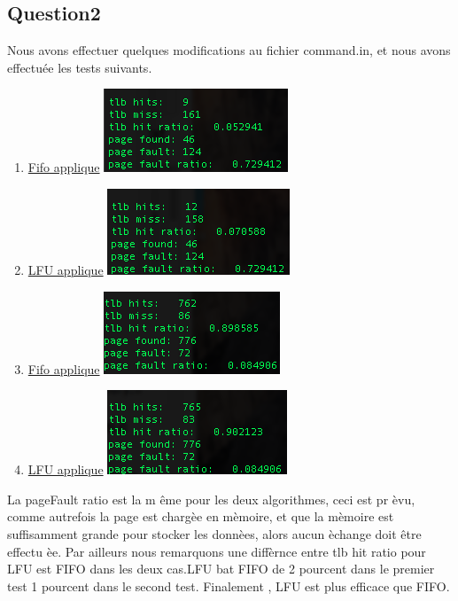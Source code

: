 \documentclass{article}
\begin{document}
\subsection{Question2}
Nous avons effectuer quelques modifications au fichier command.in, et nous avons effectu\'{e}e les tests suivants.
\begin{enumerate}
\item \underline{ Fifo applique} 
\newline
\includegraphics{./images/CaptureFIFO.png}
\item \underline{ LFU applique} 
\newline
\includegraphics{./images/CaptureLFU.png}
 \item \underline{ Fifo applique} 
 \newline
\includegraphics{./images/CaptureFIFO1.png}
 \item \underline{ LFU applique}
 \newline
\includegraphics{./images/CaptureLFU1.png}
\end{enumerate}
La pageFault ratio est la m \^{e}me pour les deux algorithmes, ceci est pr \`{e}vu, comme autrefois la page est charg\`{e}e en m\`{e}moire, et que la m\`{e}moire est suffisamment grande pour stocker les donn\`{e}es, alors aucun  \`{e}change doit \^{e}tre effectu \`{e}e.
Par ailleurs nous remarquons une diff\`{e}rnce entre tlb hit ratio pour  LFU est  FIFO dans les deux cas.LFU bat FIFO de 2 pourcent dans le premier test  1 pourcent dans le second test.
Finalement , LFU est plus efficace que FIFO.
\end{document}
